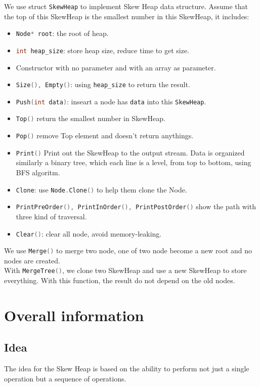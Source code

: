 \documentclass[12pt, a4paper]{article}
\newcommand{\code}[1]{\lstinline[language=C++, basicstyle=\color{orange!40!black}\ttfamily,morekeywords={cout,endl,\&,string},
keywordstyle=\color{blue},
commentstyle=\color{green!50!black},]{#1}}
\begin{document}
We use struct \code{SkewHeap} to implement Skew Heap data structure. Assume that the top of this SkewHeap is the smallest number in this SkewHeap, it includes:
\begin{itemize}
    \item \code{Node* root}: the root of heap.
    \item \code{int heap_size}: store heap size, reduce time to get size.
    \item Constructor with no parameter and with an array as parameter.
    \item \code{Size(), Empty()}: using \code{heap_size} to return the result.
    \item \code{Push(int data)}: inseart a node has \code{data} into this 
    \code{SkewHeap}.
    \item \code{Top()} return the smallest number in SkewHeap. 
    \item \code{Pop()} remove Top element and doesn't return anythings.
    \item \code{Print()} Print out the SkewHeap to the output stream. Data is organized similarly a binary tree, which each line is a level, from top to bottom, using BFS algoritm.
    \item \code{Clone}: use \code{Node.Clone()} to help them clone the Node.
    \item \code{PrintPreOrder(), PrintInOrder(), PrintPostOrder()} show the path with three kind of traversal.
    \item \code{Clear()}: clear all node, avoid memory-leaking.
\end{itemize}

We use \code{Merge()} to merge two node, one of two node become a new root and no nodes are created.\\

With \code{MergeTree()}, we clone two SkewHeap and use a new SkewHeap to store everything. With this function, the result do not depend on the old nodes.
\pagebreak

\section{Overall information}
\subsection{Idea}
The idea for the Skew Heap is based on the ability to perform not just a single operation but a sequence of operations.
\end{document}
